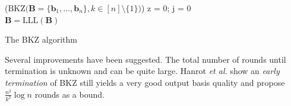 \begin{algorithm2e} %
  \Begin($\text{BKZ} {(} \mathbf{B} = \{\mathbf{b}_1, \dots, \mathbf{b}_{n}\}, k \in [n]\setminus \{1\} {)}$) %
  {
      z = 0; j = 0\\
      $\mathbf{B} = \text{LLL}(\mathbf{B})$ \\%
    }
  \caption{The BKZ algorithm \cite{SE91}} \label{alg:BKZ}
\end{algorithm2e} %


Several improvements have been suggested. The total number of rounds until termination is unknown and can be quite large. Hanrot \textit{et al.} \cite{HPS11a} show an \textit{early termination} of BKZ still yields a very good output basis quality and propose $\frac{n^2}{k^2} \log n$ rounds as a bound.

